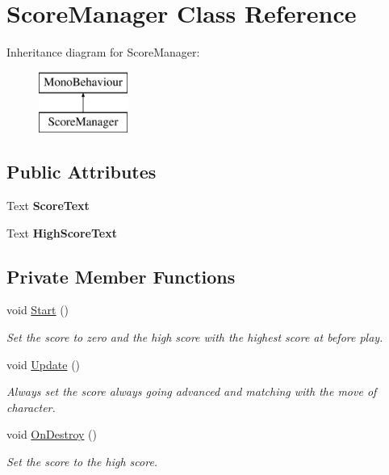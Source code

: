 \hypertarget{class_score_manager}{}\section{Score\+Manager Class Reference}
\label{class_score_manager}
Inheritance diagram for Score\+Manager\+:\begin{figure}[H]
\begin{center}
\leavevmode
\includegraphics[height=2.000000cm]{class_score_manager}
\end{center}
\end{figure}
\subsection*{Public Attributes}
\begin{DoxyCompactItemize}
\item 
\hypertarget{class_score_manager_acf7af721c5f9a891f96e0e2284cee3c4}{}\label{class_score_manager_acf7af721c5f9a891f96e0e2284cee3c4} 
Text {\bfseries Score\+Text}
\item 
\hypertarget{class_score_manager_ac45cf8552e5e277efa1e8e1628eb1466}{}\label{class_score_manager_ac45cf8552e5e277efa1e8e1628eb1466} 
Text {\bfseries High\+Score\+Text}
\end{DoxyCompactItemize}
\subsection*{Private Member Functions}
\begin{DoxyCompactItemize}
\item 
void \hyperlink{class_score_manager_a2d8e7dd8928c4fa7feb1a020971b69ac}{Start} ()
\begin{DoxyCompactList}\small\item\em Set the score to zero and the high score with the highest score at before play. \end{DoxyCompactList}\item 
void \hyperlink{class_score_manager_a0d37ca647468e53d1735d8d185b7ee34}{Update} ()
\begin{DoxyCompactList}\small\item\em Always set the score always going advanced and matching with the move of character. \end{DoxyCompactList}\item 
void \hyperlink{class_score_manager_adb4d6e4602f332f02156e43410fd12a8}{On\+Destroy} ()
\begin{DoxyCompactList}\small\item\em Set the score to the high score. \end{DoxyCompactList}\end{DoxyCompactItemize}
